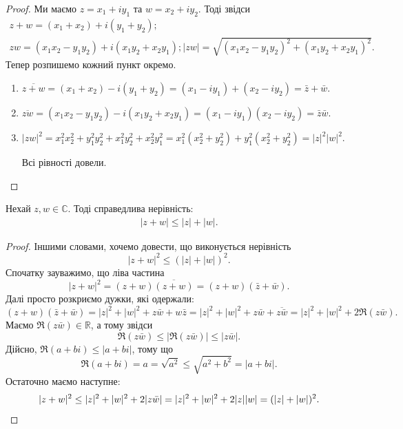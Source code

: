 \documentclass{math_library}
\begin{document}
\begin{proof}
Ми маємо $z = x_1 + iy_1$ та $w = x_2 + iy_2$. Тоді звідси
\begin{align*}
z+w = (x_1+x_2) + i (y_1+y_2);\\
zw = (x_1x_2-y_1y_2) + i(x_1y_2+x_2y_1);
|zw| = \sqrt{(x_1x_2-y_1y_2)^2 + (x_1y_2+x_2y_1)^2}.
\end{align*}
Тепер розпишемо кожний пункт окремо.
\begin{enumerate}[nosep,wide=0pt,label={\arabic*)}]
\item  
\begin{center}
$\overline{z+w} = (x_1+x_2) - i (y_1+y_2) = (x_1 - iy_1) + (x_2 - iy_2) = \bar{z} + \bar{w}$.
\end{center}
\item 
\begin{center}
$\overline{zw} = (x_1x_2-y_1y_2) - i(x_1y_2+x_2y_1) =(x_1-iy_1)(x_2-iy_2) = \bar{z} \bar{w}$.
\end{center}
\item
\begin{center}
$|zw|^2 = x_1^2x_2^2+y_1^2y_2^2+x_1^2y_2^2+x_2^2y_1^2 = x_1^2(x_2^2+y_2^2) + y_1^2(x_2^2+y_2^2) = |z|^2 |w|^2$.
\end{center}
Всі рівності довели. \qedhere
\end{enumerate}
\end{proof}

\begin{proposition}
Нехай $z,w \in \mathbb{C}$. Тоді справедлива нерівність:
\begin{align*}
|z+w| \leq |z| + |w|.
\end{align*}
\end{proposition}

\begin{proof}
Іншими словами, хочемо довести, що виконується нерівність
\[
|z+w|^2 \leq (|z|+|w|)^2.
\]
Спочатку зауважимо, що ліва частина
\[
|z+w|^2 = (z+w)\overline{(z+w)} = (z+w)(\bar{z}+\bar{w}).
\]
Далі просто розкриємо дужки, які одержали:\\
\[
(z+w)(\bar{z}+\bar{w}) = |z|^2 + |w|^2 + z\bar{w} + w\bar{z} = |z|^2 + |w|^2 + z \bar{w} + \overline{z \bar{w}} = |z|^2 + |w|^2 + 2 \Re (z \bar{w}).
\]
Маємо $\Re (z \bar{w}) \in \mathbb{R}$, а тому звідси 
\[
\Re (z \bar{w}) \leq |\Re (z \bar{w})| \leq |z \bar{w}|.
\]
Дійсно, $\Re (a+bi) \leq |a+bi|$, тому що 
\[
\Re (a+bi) = a = \sqrt{a^2} \leq \sqrt{a^2+b^2} = |a+bi|.
\]
Остаточно маємо наступне:
\[
|z+w|^2 \leq |z|^2 + |w|^2 + 2|z \bar{w}| = |z|^2 + |w|^2 + 2|z| |w| = (|z|+|w|)^2. \qedhere
\]
\end{proof}
\end{document}
